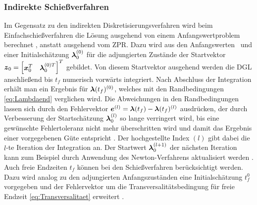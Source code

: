 \subsubsection{Indirekte Schießverfahren}\label{subsubsec:Schießverfahren_indirekt}
Im Gegensatz zu den indirekten Diskretisierungsverfahren wird beim Einfachschießverfahren die Lösung ausgehend von einem Anfangswertproblem berechnet \cite{Papageorgiou.2012}, anstatt ausgehend vom \gls{ZPR}. Dazu wird aus den Anfangswerten \xzero~und einer Initialschätzung $\boldsymbol{\lambda}_0^{(0)}$ für die adjungierten Zustände der Startvektor $\boldsymbol{z}_0 = \begin{bmatrix}\boldsymbol{x}_0^T & \boldsymbol{\lambda}_0^{(0)T}\end{bmatrix}^T$ gebildet. Von diesem Startvektor ausgehend werden die \gls{DGL} anschließend bis $t_f$ numerisch vorwärts integriert. Nach Abschluss der Integration erhält man ein Ergebnis für $\boldsymbol{\lambda}(t_f)^{(0)}$, welches mit den Randbedingungen \eqref{eq:Lambdaend} verglichen wird. Die Abweichungen in den Randbedingungen lassen sich durch den Fehlervektor $\boldsymbol{e}^{(l)} = \boldsymbol{\lambda}(t_f) - \boldsymbol{\lambda}(t_f)^{(l)}$ ausdrücken, der durch Verbesserung der Startschätzung $\boldsymbol{\lambda}_0^{(l)}$ so lange verringert wird, bis eine gewünschte Fehlertoleranz nicht mehr überschritten wird und damit das Ergebnis einer vorgegebenen Güte entspricht \cite{Papageorgiou.2012}. Der hochgestellte Index $(l)$ gibt dabei die $l$-te Iteration der Integration an. Der Startwert $\boldsymbol{\lambda}_0^{(l+1)}$ der nächsten Iteration kann zum Beispiel durch Anwendung des Newton-Verfahrens aktualisiert werden \cite{Papageorgiou.2012}.
Auch freie Endzeiten $t_f$ können bei den Schießverfahren berücksichtigt werden. Dazu wird analog zu den adjungierten Anfangszuständen eine Initialschätzung $t_f^{0}$ vorgegeben und der Fehlervektor um die Transversalitätsbedingung für freie Endzeit \eqref{eq:Transversalitaet} erweitert \cite{Papageorgiou.2012}.

